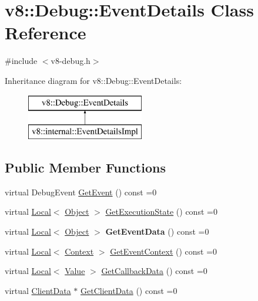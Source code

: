 \hypertarget{classv8_1_1_debug_1_1_event_details}{}\section{v8\+:\+:Debug\+:\+:Event\+Details Class Reference}
\label{classv8_1_1_debug_1_1_event_details}


{\ttfamily \#include $<$v8-\/debug.\+h$>$}

Inheritance diagram for v8\+:\+:Debug\+:\+:Event\+Details\+:\begin{figure}[H]
\begin{center}
\leavevmode
\includegraphics[height=2.000000cm]{classv8_1_1_debug_1_1_event_details}
\end{center}
\end{figure}
\subsection*{Public Member Functions}
\begin{DoxyCompactItemize}
\item 
virtual Debug\+Event \hyperlink{classv8_1_1_debug_1_1_event_details_a3743044e92847f4647cef5f597ac1863}{Get\+Event} () const  =0
\item 
virtual \hyperlink{classv8_1_1_local}{Local}$<$ \hyperlink{classv8_1_1_object}{Object} $>$ \hyperlink{classv8_1_1_debug_1_1_event_details_a0d68512e6225f318b87e9ec440282f73}{Get\+Execution\+State} () const  =0
\item 
virtual \hyperlink{classv8_1_1_local}{Local}$<$ \hyperlink{classv8_1_1_object}{Object} $>$ {\bfseries Get\+Event\+Data} () const  =0\hypertarget{classv8_1_1_debug_1_1_event_details_aa1bb2a9db9466badb797067a5cdbd466}{}\label{classv8_1_1_debug_1_1_event_details_aa1bb2a9db9466badb797067a5cdbd466}

\item 
virtual \hyperlink{classv8_1_1_local}{Local}$<$ \hyperlink{classv8_1_1_context}{Context} $>$ \hyperlink{classv8_1_1_debug_1_1_event_details_a31863285c87e36f5c744e148cc3650e5}{Get\+Event\+Context} () const  =0
\item 
virtual \hyperlink{classv8_1_1_local}{Local}$<$ \hyperlink{classv8_1_1_value}{Value} $>$ \hyperlink{classv8_1_1_debug_1_1_event_details_acad01eae9062893a7d5252a0596ebb3d}{Get\+Callback\+Data} () const  =0
\item 
virtual \hyperlink{classv8_1_1_debug_1_1_client_data}{Client\+Data} $\ast$ \hyperlink{classv8_1_1_debug_1_1_event_details_ac9d8db55000c0fd27b1a02cbef5b267b}{Get\+Client\+Data} () const  =0
\end{DoxyCompactItemize}


